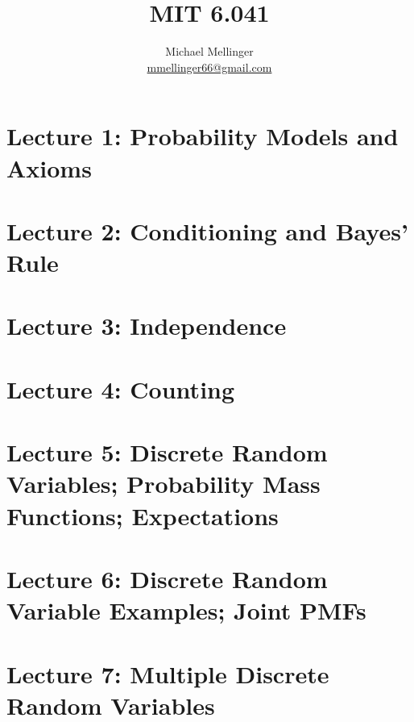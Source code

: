 \documentclass{article}
\title{MIT 6.041}
\author{Michael Mellinger \\ \href{mailto:mmellinger66@gmail.com}{mmellinger66@gmail.com} }
\begin{document}
\maketitle
\tableofcontents
\pagebreak
\listoffigures
\pagebreak
\listoftables
\pagebreak
\listofmyequations
\pagebreak

\section{Lecture 1: Probability Models and Axioms}



\section{Lecture 2: Conditioning and Bayes' Rule}



\section{Lecture 3: Independence}



\section{Lecture 4: Counting}



\section{Lecture 5: Discrete Random Variables; Probability Mass Functions; Expectations}



\section{Lecture 6: Discrete Random Variable Examples; Joint PMFs}



\section{Lecture 7: Multiple Discrete Random Variables}


\end{document}
